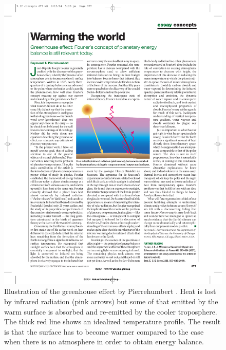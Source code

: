 \documentclass[12pt]{book}
\begin{document}
\begin{figure}
\begin{center}
\includegraphics[width=8 cm]{../external_figures/Greenhouse_effect_illustration_Pierrehumbert_2004}
\end{center}
\caption{ Illustration of the greenhouse effect by Pierrehumbert \cite{Pierrehumbert2004}. Heat is lost by infrared radiation (pink arrows) but some of that emitted by the warm surface is absorbed and re-emitted by the cooler troposphere. The thick red line shows an idealized temperature profile. The result is that the surface has to become warmer compared to the case when there is no atmosphere in order to obtain energy balance.    } 
\label{fig:greenhouse_effect_illustration}
\end{figure}
\end{document}
